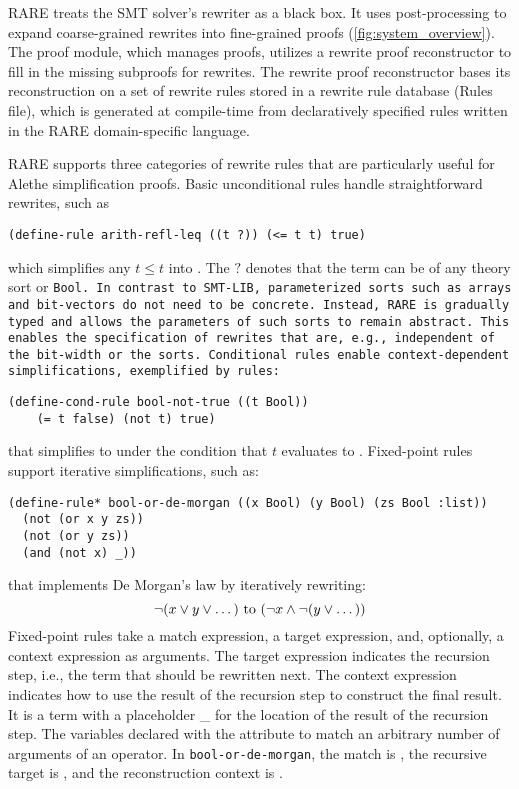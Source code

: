 RARE treats the SMT solver’s rewriter as a black box. It uses post-processing to expand coarse-grained rewrites into fine-grained proofs (\cref{fig:system_overview}).
The proof module, which manages proofs, utilizes a rewrite proof reconstructor to fill in the missing subproofs for rewrites.
The rewrite proof reconstructor bases its reconstruction on a set of rewrite rules stored in a rewrite rule database (Rules file), which is generated at compile-time from declaratively specified rules written in the RARE domain-specific language.

RARE supports three categories of rewrite rules that are particularly useful for Alethe simplification proofs.
Basic unconditional rules handle straightforward rewrites, such as

\begin{lstlisting}[language=RARE,numbers=none,frame=none,basicstyle=\ttfamily\small]
(define-rule arith-refl-leq ((t ?)) (<= t t) true)
\end{lstlisting}

which simplifies any $t \leq t$ into \true. The $?$ denotes that the term can be of any theory sort or \tt{Bool}.
In contrast to SMT-LIB, parameterized sorts such as arrays and bit-vectors do not need to be concrete.
Instead, RARE is gradually typed and allows the parameters of such sorts to remain abstract.
This enables the specification of rewrites that are, e.g., independent of the bit-width or the sorts.
%
Conditional rules enable context-dependent simplifications, exemplified by rules:

\begin{lstlisting}[language=RARE,numbers=none,frame=none,basicstyle=\ttfamily\small]
(define-cond-rule bool-not-true ((t Bool))
    (= t false) (not t) true)
\end{lstlisting}
%
that simplifies  to  under the condition that $t$ evaluates to .
%
Fixed-point rules support iterative simplifications, such as:
%
\begin{lstlisting}[language=RARE,numbers=none,frame=none,basicstyle=\ttfamily\small]
(define-rule* bool-or-de-morgan ((x Bool) (y Bool) (zs Bool :list)) 
  (not (or x y zs))
  (not (or y zs))
  (and (not x) _))
\end{lstlisting}
%
that implements De Morgan's law by iteratively rewriting:
\[
  \neg (x \lor y \lor \dots)$ to $(\neg x \land \neg (y \lor \dots))
\]
Fixed-point rules take a match expression, a target expression, and, optionally, a context expression as arguments.
The target expression indicates the recursion step, i.e., the term that should be rewritten next.
The context expression indicates how to use the result of the recursion step to construct the final result.
It is a term with a placeholder \_ for the location of the result of the recursion step.
The variables declared with the  attribute to match an arbitrary number of arguments of an operator.
In \texttt{bool-or-de-morgan}, the match is , the recursive target is , and the reconstruction context is .

